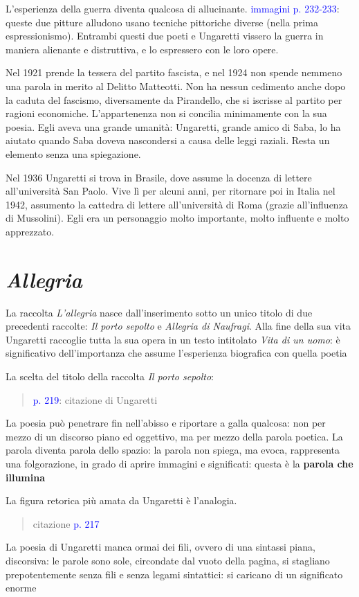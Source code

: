\documentclass[a4paper, twoside, titlepage]{book}
\newcommand{\citazione}[1]{%
  \begin{quotation}
  \begin{linenumbers}
  \modulolinenumbers[5]
  \begingroup
  \setlength{\parindent}{0cm}
  \noindent #1
  \endgroup
  \end{linenumbers}
  \end{quotation}\setcounter{linenumber}{1}
  }
\renewcommand{\emph}[1]{\textcolor{blue}{#1}}
\begin{document}
L'esperienza della guerra diventa qualcosa di allucinante.
\emph{immagini p. 232-233}: queste due pitture alludono usano tecniche pittoriche diverse (nella prima espressionismo). Entrambi questi due poeti e Ungaretti vissero la guerra in maniera alienante e distruttiva, e lo espressero con le loro opere.

Nel 1921 prende la tessera del partito fascista, e nel 1924 non spende nemmeno una parola in merito al Delitto Matteotti.
Non ha nessun cedimento anche dopo la caduta del fascismo, diversamente da Pirandello, che si iscrisse al partito per ragioni economiche.
L'appartenenza non si concilia minimamente con la sua poesia. Egli aveva una grande umanità: Ungaretti, grande amico di Saba, lo ha aiutato quando Saba doveva nascondersi a causa delle leggi raziali. Resta un elemento senza una spiegazione.

Nel 1936 Ungaretti si trova in Brasile, dove assume la docenza di lettere all'università San Paolo. Vive lì per alcuni anni, per ritornare poi in Italia nel 1942, assumento la cattedra di lettere all'università di Roma (grazie all'influenza di Mussolini).
Egli era un personaggio molto importante, molto influente e molto apprezzato.

\section{\textit{Allegria}}

La raccolta \textit{L'allegria} nasce dall'inserimento sotto un unico titolo di due precedenti raccolte: \textit{Il porto sepolto} e \textit{Allegria di Naufragi}. Alla fine della sua vita Ungaretti raccoglie tutta la sua opera in un testo intitolato \textit{Vita di un uomo}: è significativo dell'importanza che assume l'esperienza biografica con quella poetia

La scelta del titolo della raccolta \textit{Il porto sepolto}:
\citazione{\emph{p. 219}: citazione di Ungaretti}

La poesia può penetrare fin nell'abisso e riportare a galla qualcosa: non per mezzo di un discorso piano ed oggettivo, ma per mezzo della parola poetica.
La parola diventa parola dello spazio: la parola non spiega, ma evoca, rappresenta una folgorazione, in grado di aprire immagini e significati: questa è la \textbf{parola che illumina}

La figura retorica più amata da Ungaretti è l'analogia.
\citazione{citazione \emph{p. 217}}

La poesia di Ungaretti manca ormai dei fili, ovvero di una sintassi piana, discorsiva: le parole sono sole, circondate dal vuoto della pagina, si stagliano prepotentemente senza fili e senza legami sintattici: si caricano di un significato enorme
\end{document}
